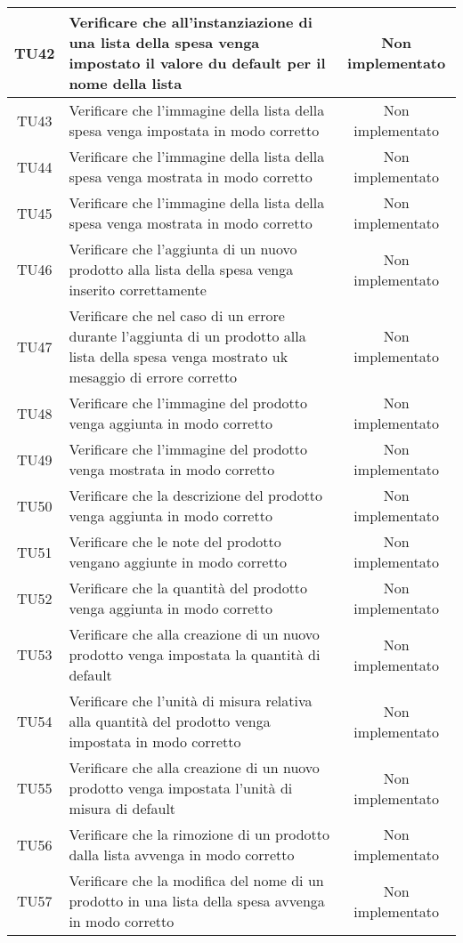 \begin{center}
\begin{longtable}{|c|>{\centering}m{10cm}|c|}
		TU42 & Verificare che all'instanziazione di una lista della spesa venga impostato il valore du default per il nome della lista & Non implementato \\ \hline
		TU43 & Verificare che l'immagine della lista della spesa venga impostata in modo corretto & Non implementato \\ \hline
		TU44 & Verificare che l'immagine della lista della spesa venga mostrata in modo corretto & Non implementato \\ \hline
		TU45 & Verificare che l'immagine della lista della spesa venga mostrata in modo corretto & Non implementato \\ \hline
		TU46 & Verificare che l'aggiunta di un nuovo prodotto alla lista della spesa venga inserito correttamente & Non implementato \\ \hline
		TU47 & Verificare che nel caso di un errore durante l'aggiunta di un prodotto alla lista della spesa venga mostrato uk mesaggio di errore corretto & Non implementato \\ \hline
		TU48 & Verificare che l'immagine del prodotto venga aggiunta in modo corretto & Non implementato \\ \hline
		TU49 & Verificare che l'immagine del prodotto venga mostrata in modo corretto & Non implementato \\ \hline
		TU50 & Verificare che la descrizione del prodotto venga aggiunta in modo corretto & Non implementato \\ \hline
		TU51 & Verificare che le note del prodotto vengano aggiunte in modo corretto & Non implementato \\ \hline
		TU52 & Verificare che la quantità del prodotto venga aggiunta in modo corretto & Non implementato \\ \hline
		TU53 & Verificare che alla creazione di un nuovo prodotto venga impostata la quantità di default & Non implementato \\ \hline
		TU54 & Verificare che l'unità di misura relativa alla quantità del prodotto venga impostata in modo corretto & Non implementato \\ \hline
		TU55 & Verificare che alla creazione di un nuovo prodotto venga impostata l'unità di misura di default & Non implementato \\ \hline
		TU56 & Verificare che la rimozione di un prodotto dalla lista avvenga in modo corretto & Non implementato \\ \hline
		TU57 & Verificare che la modifica del nome di un prodotto in una lista della spesa avvenga in modo corretto & Non implementato \\ \hline

\end{longtable}
\end{center}
